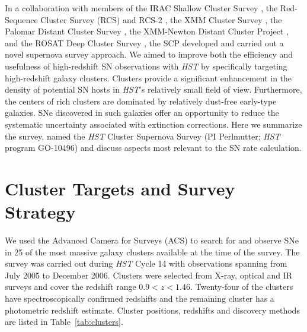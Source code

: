 
In a collaboration with members of the IRAC Shallow Cluster Survey
\citep{eisenhardt08a}, the Red-Sequence Cluster Survey (RCS) and RCS-2
\citep{gladders05a,yee07a}, the XMM Cluster Survey \citep{sahlen09a},
the Palomar Distant Cluster Survey \citep{postman96a}, the XMM-Newton
Distant Cluster Project \citep{bohringer05a}, and the ROSAT Deep
Cluster Survey \citep[RDCS;][]{rosati99a}, the SCP developed and
carried out a novel supernova survey approach. We aimed to improve
both the efficiency and usefulness of high-redshift SN observations
with \emph{HST} by specifically targeting high-redshift galaxy
clusters. Clusters provide a significant enhancement in the density of
potential SN hosts in \emph{HST}'s relatively small field of view.
Furthermore, the centers of rich clusters are dominated by relatively
dust-free early-type galaxies. SNe discovered in such galaxies offer
an opportunity to reduce the systematic uncertainty associated with
extinction corrections. Here we summarize the survey, named
the \emph{HST} Cluster Supernova Survey (PI Perlmutter; \emph{HST}
program GO-10496) and discuss aspects most relevant to the SN rate
calculation.

\section{Cluster Targets and Survey Strategy}

We used the Advanced Camera for Surveys (ACS) to search for and
observe SNe in 25 of the most massive galaxy clusters available at the
time of the survey. The survey was carried out during \emph{HST} Cycle
14 with observations spanning from July 2005 to December 2006.
Clusters were selected from X-ray, optical and IR surveys and cover
the redshift range $0.9<z<1.46$. Twenty-four of the clusters have
spectroscopically confirmed redshifts and the remaining cluster has a
photometric redshift estimate.  Cluster positions, redshifts and
discovery methods are listed in Table~\ref{tab:clusters}.

